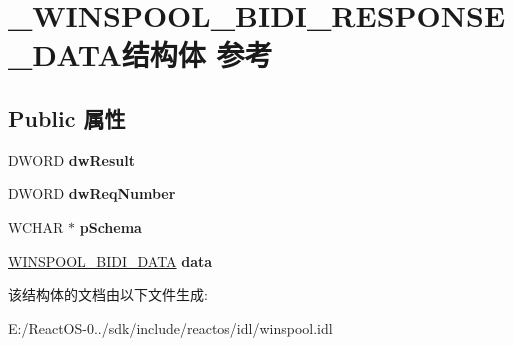 \hypertarget{struct___w_i_n_s_p_o_o_l___b_i_d_i___r_e_s_p_o_n_s_e___d_a_t_a}{}\section{\+\_\+\+W\+I\+N\+S\+P\+O\+O\+L\+\_\+\+B\+I\+D\+I\+\_\+\+R\+E\+S\+P\+O\+N\+S\+E\+\_\+\+D\+A\+T\+A结构体 参考}
\label{struct___w_i_n_s_p_o_o_l___b_i_d_i___r_e_s_p_o_n_s_e___d_a_t_a}
\subsection*{Public 属性}
\begin{DoxyCompactItemize}
\item 
\mbox{\label{struct___w_i_n_s_p_o_o_l___b_i_d_i___r_e_s_p_o_n_s_e___d_a_t_a_ad03a2715781f591adea85d9e84c8930a}} 
D\+W\+O\+RD {\bfseries dw\+Result}
\item 
\mbox{\label{struct___w_i_n_s_p_o_o_l___b_i_d_i___r_e_s_p_o_n_s_e___d_a_t_a_a26ab6e085541feface099f00a335725a}} 
D\+W\+O\+RD {\bfseries dw\+Req\+Number}
\item 
\mbox{\label{struct___w_i_n_s_p_o_o_l___b_i_d_i___r_e_s_p_o_n_s_e___d_a_t_a_a47897f1889a06f0c636715ff385cdf26}} 
W\+C\+H\+AR $\ast$ {\bfseries p\+Schema}
\item 
\mbox{\label{struct___w_i_n_s_p_o_o_l___b_i_d_i___r_e_s_p_o_n_s_e___d_a_t_a_a2619fcd598401acf5bc33d457f95ddee}} 
\hyperlink{struct___w_i_n_s_p_o_o_l___b_i_d_i___d_a_t_a}{W\+I\+N\+S\+P\+O\+O\+L\+\_\+\+B\+I\+D\+I\+\_\+\+D\+A\+TA} {\bfseries data}
\end{DoxyCompactItemize}


该结构体的文档由以下文件生成\+:\begin{DoxyCompactItemize}
\item 
E\+:/\+React\+O\+S-\/0../sdk/include/reactos/idl/winspool.\+idl\end{DoxyCompactItemize}
